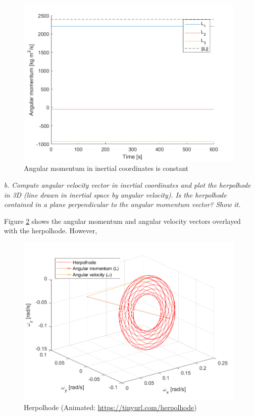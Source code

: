 \begin{figure}[H]
\centering
\includegraphics[scale=0.6]{Images/ps3_problem7a.png}
\caption{Angular momentum in inertial coordinates is constant}
\label{fig:ps3_problem7a}
\end{figure}

\textit{b. Compute angular velocity vector in inertial coordinates and plot the herpolhode in 3D (line drawn in inertial space by angular velocity). Is the herpolhode contained in a plane perpendicular to the angular momentum vector? Show it.}

Figure \ref{fig:ps3_problem7b} shows the angular momentum and angular velocity vectors overlayed with the herpolhode. However, 

\begin{figure}[H]
\centering
\includegraphics[scale=0.6]{Images/ps3_problem7b.png}
\caption{Herpolhode (Animated: \protect\url{https://tinyurl.com/herpolhode})}
\label{fig:ps3_problem7b}
\end{figure}

